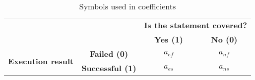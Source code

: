 \begin{table}[h!]
\centering
\begin{tabular}{|c|c|c|c|}
\hline
\multicolumn{2}{|c|}{} & \multicolumn{2}{c|}{\textbf{Is the statement covered?}}\\
\cline{3-4}
\multicolumn{2}{|c|}{} & \textbf{Yes (1)} & \textbf{No (0)}  \\ \hline
\multirow{2}{*}{\textbf{Execution result}} & \textbf{Failed (0)} &$a_{ef}$ & $a_{nf}$\\
 & \textbf{Successful (1)} & $a_{es}$ & $a_{ns}$\\ \hline
\end{tabular}
\caption{Symbols used in coefficients}
\label{tab: Sus symbols}
\end{table}